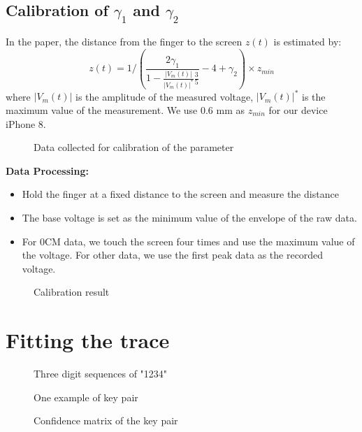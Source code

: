 \documentclass[10pt,twocolumn,letterpaper]{article}
\begin{document}
\subsection{Calibration of $\gamma_1$ and $\gamma_2$}
In the paper, the distance from the finger to the screen $z(t)$ is estimated by:
\begin{equation}
    z(t) = 1/(\frac{2\gamma_1}{1 - \frac{|V_m(t)|}{|V_m(t)|^*}\frac{3}{5}}-4+\gamma_2)\times z_{min}
\end{equation}
where $|V_m(t)|$ is the amplitude of the measured voltage, $|V_m(t)|^*$ is the maximum value of the measurement. We use 0.6 mm as $z_{min}$ for our device iPhone 8.

\begin{figure}[htbp]
    \centering
    
    \caption{Data collected for calibration of the parameter}
\end{figure}

\textbf{Data Processing:}
\begin{itemize}
    \item Hold the finger at a fixed distance to the screen and measure the distance
    \item The base voltage is set as the minimum value of the envelope of the raw data.
    \item For 0CM data, we touch the screen four times and use the maximum value of the voltage. For other data, we use the first peak data as the recorded voltage.
\end{itemize}
\begin{figure}[htbp]
    \centering
    
    \caption{Calibration result}
\end{figure}

\section{Fitting the trace}
\begin{figure}[htbp]
    \centering
    
    \caption{Three digit sequences of "1234"}
\end{figure}

\begin{figure}[htbp]
    \centering
    
    \caption{One example of key pair}
\end{figure}

\begin{figure}[htbp!]
    \centering
    
    \caption{Confidence matrix of the key pair}
\end{figure}
\end{document}
